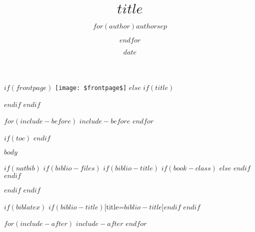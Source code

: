 \documentclass[$if(classoption)$$classoption$,$endif$$if(fontsize)$$fontsize$,$endif$$if(lang)$$lang$,$endif$]{$documentclass$}
\title{$title$}
\author{$for(author)$$author$$sep$ \and $endfor$}
\date{$date$}
\makeatletter
\def\maxwidth{\ifdim\Gin@nat@width>\linewidth\linewidth
    \else\Gin@nat@width\fi}
\let\Oldincludegraphics\includegraphics
\renewcommand{\includegraphics}[1]{\Oldincludegraphics[width=\maxwidth]{#1}}
\makeatother
\begin{document}
    $if(frontpage)$
        \thispagestyle{empty}
        \texttt{[image: \$frontpage\$]}
    $else$
        $if(title)$
            \maketitle
            \thispagestyle{empty}
            \pagebreak
        $endif$
    $endif$
        

    $for(include-before)$
        $include-before$
    $endfor$

    
    $if(toc)$
    {
        \hypersetup{linkcolor=violet}
        \setcounter{tocdepth}{$toc-depth$}
        \tableofcontents
    }
    $endif$


    $body$
    

    $if(natbib)$
        $if(biblio-files)$
            $if(biblio-title)$
                $if(book-class)$
                    \renewcommand\bibname{$biblio-title$}
                $else$
                    \renewcommand\refname{$biblio-title$}
                $endif$
            $endif$
            
        $endif$
    $endif$
    
    $if(biblatex)$
        \printbibliography$if(biblio-title)$[title=$biblio-title$]$endif$
    $endif$

    
    $for(include-after)$
        $include-after$
    $endfor$
    
\end{document}
